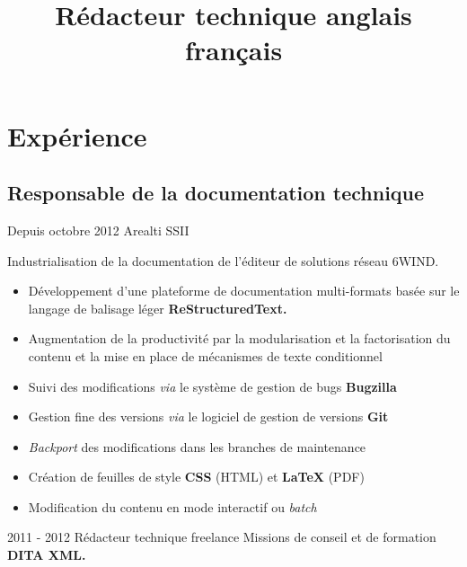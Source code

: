 \documentclass[12pt,a4paper,roman]{moderncv}
\title
    {Rédacteur technique anglais français}
\begin{document}
\makecvtitle %


\section{Expérience}

\subsection{Responsable de la documentation technique}

\cventry
    {Depuis octobre 2012}
    {Arealti}
    {SSII}
    {}
    {}
    {Industrialisation de la documentation de l'éditeur de solutions réseau
      6WIND.
      \begin{itemize}
      \item Développement d'une plateforme de documentation multi-formats
        basée sur le langage de balisage léger \textbf{ReStructuredText.}
      \item Augmentation de la productivité par la modularisation et la
        factorisation du contenu et la mise en place de mécanismes de texte
        conditionnel
      \item Suivi des modifications \textit{via} le système de gestion de
        bugs \textbf{Bugzilla}
      \item Gestion fine des versions \textit{via} le logiciel de gestion de
        versions \textbf{Git}
      \item \textit{Backport} des modifications dans les branches de
        maintenance
      \item Création de feuilles de style \textbf{CSS} (HTML) et
        \textbf{\LaTeX} (PDF)
      \item Modification du contenu en mode interactif ou \textit{batch}
      \end{itemize}
    }


\cventry
    {2011 - 2012}
    {Rédacteur technique freelance}
    {\textsc{}}
    {}
    {}
    {Missions de conseil et de formation \textbf{DITA XML.}}

\end{document}
